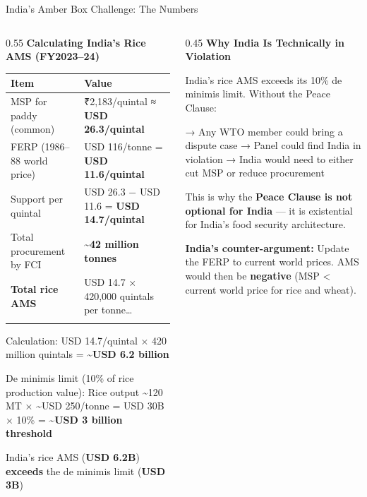 \documentclass[
  ignorenonframetext,
  aspectratio=169,
]{beamer}
\makeatletter
\let\quarto@originallabel\label
\DeclareRobustCommand*{\label}[1]{\quarto@originallabel{#1}}
\makeatother
\begin{document}
\begin{frame}{India's Amber Box Challenge: The Numbers}
\label{indias-amber-box-challenge-the-numbers}
\begin{columns}[T]
\begin{column}{0.55\linewidth}
\textbf{Calculating India's Rice AMS (FY2023--24)}

\begin{longtable}[]{@{}ll@{}}
\toprule\noalign{}
Item & Value \\
\midrule\noalign{}
\endhead
MSP for paddy (common) & ₹2,183/quintal ≈ \textbf{USD 26.3/quintal} \\
FERP (1986--88 world price) & USD 116/tonne = \textbf{USD
11.6/quintal} \\
Support per quintal & USD 26.3 − USD 11.6 = \textbf{USD 14.7/quintal} \\
Total procurement by FCI & \textasciitilde{}\textbf{42 million
tonnes} \\
\textbf{Total rice AMS} & USD 14.7 × 420,000 quintals per
tonne\ldots{} \\
\bottomrule\noalign{}
\end{longtable}

Calculation: USD 14.7/quintal × 420 million quintals =
\textbf{\textasciitilde USD 6.2 billion}

De minimis limit (10\% of rice production value): Rice output
\textasciitilde120 MT × \textasciitilde USD 250/tonne = USD 30B × 10\% =
\textbf{\textasciitilde USD 3 billion threshold}

India's rice AMS (\textbf{USD 6.2B}) \textbf{exceeds} the de minimis
limit (\textbf{USD 3B})
\end{column}

\begin{column}{0.45\linewidth}
\textbf{Why India Is Technically in Violation}

India's rice AMS exceeds its 10\% de minimis limit. Without the Peace
Clause:

→ Any WTO member could bring a dispute case → Panel could find India in
violation → India would need to either cut MSP or reduce procurement

This is why the \textbf{Peace Clause is not optional for India} --- it
is existential for India's food security architecture.

\textbf{India's counter-argument:} Update the FERP to current world
prices. AMS would then be \textbf{negative} (MSP \textless{} current
world price for rice and wheat).
\end{column}
\end{columns}
\end{frame}
\end{document}

